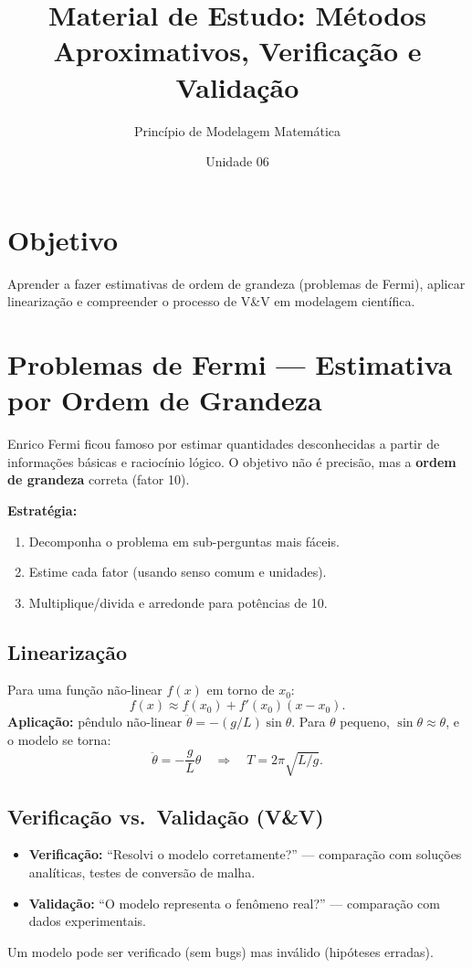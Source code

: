 \documentclass[12pt,a4paper]{article}
\title{Material de Estudo: M\'etodos Aproximativos, Verifica\c{c}\~ao e Valida\c{c}\~ao}
\author{Princ\'ipio de Modelagem Matem\'atica}
\date{Unidade 06}
\begin{document}
\maketitle

\section*{Objetivo}
Aprender a fazer estimativas de ordem de grandeza (problemas de Fermi), aplicar lineariza\c{c}\~ao e compreender o processo de V\&V em modelagem cient\'ifica.

\section*{Problemas de Fermi --- Estimativa por Ordem de Grandeza}
Enrico Fermi ficou famoso por estimar quantidades desconhecidas a partir de informa\c{c}\~oes b\'asicas e racioc\'inio l\'ogico. O objetivo n\~ao \'e precis\~ao, mas a \textbf{ordem de grandeza} correta (fator 10).

\textbf{Estrat\'egia:}
\begin{enumerate}
  \item Decomponha o problema em sub-perguntas mais f\'aceis.
  \item Estime cada fator (usando senso comum e unidades).
  \item Multiplique/divida e arredonde para pot\^encias de 10.
\end{enumerate}

\subsection*{Lineariza\c{c}\~ao}
Para uma fun\c{c}\~ao n\~ao-linear $f(x)$ em torno de $x_0$:
\[
f(x) \approx f(x_0) + f'(x_0)(x-x_0).
\]
\textbf{Aplica\c{c}\~ao:} p\^endulo n\~ao-linear $\ddot\theta = -(g/L)\sin\theta$.
Para $\theta$ pequeno, $\sin\theta \approx \theta$, e o modelo se torna:
\[
\ddot\theta = -\frac{g}{L}\theta \quad \Rightarrow \quad T = 2\pi\sqrt{L/g}.
\]

\subsection*{Verifica\c{c}\~ao vs.\ Valida\c{c}\~ao (V\&V)}
\begin{itemize}
  \item \textbf{Verifica\c{c}\~ao:} ``Resolvi o modelo corretamente?'' --- compara\c{c}\~ao com solu\c{c}\~oes anal\'iticas, testes de convers\~ao de malha.
  \item \textbf{Valida\c{c}\~ao:} ``O modelo representa o fen\^omeno real?'' --- compara\c{c}\~ao com dados experimentais.
\end{itemize}
Um modelo pode ser verificado (sem bugs) mas inv\'alido (hip\'oteses erradas).
\end{document}
